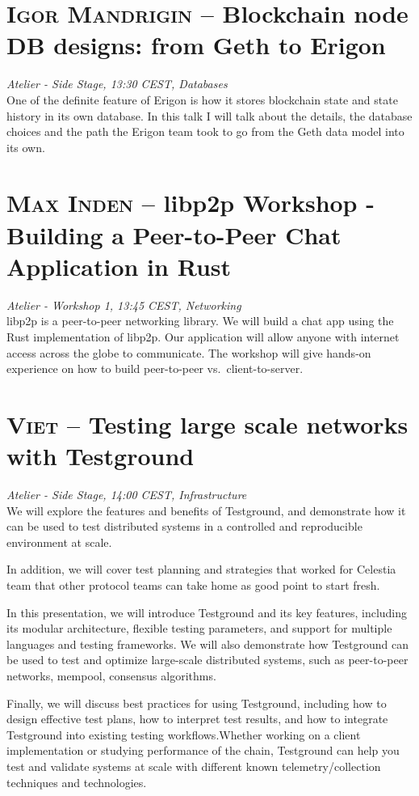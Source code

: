 \section {\textsc{Igor Mandrigin} -- Blockchain node DB designs: from Geth to Erigon
} \noindent \textit {Atelier - Side Stage, 13:30 CEST, Databases
}\\[1em] One of the definite feature of Erigon is how it stores blockchain state and state history in its own database. In this talk I will talk about the details, the database choices and the path the Erigon team took to go from the Geth data model into its own.
\par \clearpage
\section {\textsc{Max Inden} -- libp2p Workshop - Building a Peer-to-Peer Chat Application in Rust
} \noindent \textit {Atelier - Workshop 1, 13:45 CEST, Networking
}\\[1em] libp2p is a peer-to-peer networking library. We will build a chat app using the Rust implementation of libp2p. Our application will allow anyone with internet access across the globe to communicate. The workshop will give hands-on experience on how to build peer-to-peer vs.~client-to-server.
\par \clearpage
\section {\textsc{Viet} -- Testing large scale networks with Testground
} \noindent \textit {Atelier - Side Stage, 14:00 CEST, Infrastructure
}\\[1em] We will explore the features and benefits of Testground, and demonstrate how it can be used to test distributed systems in a controlled and reproducible environment at scale.

In addition, we will cover test planning and strategies that worked for Celestia team that other protocol teams can take home as good point to start fresh.
\par In this presentation, we will introduce Testground and its key features, including its modular architecture, flexible testing parameters, and support for multiple languages and testing frameworks. We will also demonstrate how Testground can be used to test and optimize large-scale distributed systems, such as peer-to-peer networks, mempool, consensus algorithms.

Finally, we will discuss best practices for using Testground, including how to design effective test plans, how to interpret test results, and how to integrate Testground into existing testing workflows.Whether working on a client implementation or studying performance of the chain, Testground can help you test and validate systems at scale with different known telemetry/collection techniques and technologies.
\clearpage

